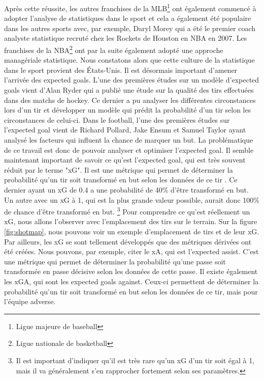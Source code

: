 \documentclass[12pt]{article}
\begin{document}
\newline
Après cette réussite, les autres franchises de la MLB\footnote{Ligue majeure de baseball} ont également commencé à adopter l'analyse de statistiques dans le sport et cela a également été populaire dans les autres sports avec, par exemple, Daryl Morey qui a été le premier coach analyste statistique recruté chez les Rockets de Houston en NBA en 2007. \cite{DarylMorey13year2020}
Les franchises de la NBA\footnote{Ligue nationale de basketball} ont par la suite également adopté une approche managériale statistique.
Nous constatons alors que cette culture de la statistique dans le sport provient des États-Unis.
\newline
Il est désormais important d'amener l'arrivée des expected goals. 
L'une des premières études sur un modèle d'expected goals vient d'Alan Ryder qui a publié une étude sur la qualité des tirs effectuées dans des matchs de hockey. \cite{ryderIsolatingShotQuality2004}
Ce dernier a pu analyser les différentes circonstances lors d'un tir et développer un modèle qui prédit la probabilité d'un tir selon les circonstances de celui-ci.
Dans le football, l'une des premières études sur l'expected goal vient de Richard Pollard, Jake Ensum et Samuel Taylor ayant analysé les facteurs qui influent la chance de marquer un but. \cite{pollardEstimatingProbabilityShot2004} La problématique de ce travail est donc de pouvoir analyser et optimiser l'expected goal.
\newline\newline
Il semble maintenant important de savoir ce qu'est l'expected goal, qui est très souvent réduit par le terme "xG". 
Il est une métrique qui permet de déterminer la probabilité qu'un tir soit transformé en but selon les données de ce tir \cite{XGExplainedFBrefa}.
Ce dernier ayant un xG de 0.4 a une probabilité de 40\% d'être transformé en but. Un autre avec un xG à 1, qui est la plus grande valeur possible, aurait donc 100\% de chance d'être transformé en but.
\footnote{Il est important d'indiquer qu'il est très rare qu'un xG d'un tir soit égal à 1, mais il va généralement s'en rapprocher fortement selon ses paramètres.} \cite{pettyWhatExpectedGoals2018a}
\newline\newline
Pour comprendre ce qu'est réellement un xG, nous allons l'observer avec l'emplacement des tirs sur le terrain.
Sur la figure \ref{fig:shotmap}, nous pouvons voir un exemple d'emplacement de tirs et de leur xG.
\newline \newline
Par ailleurs, les xG se sont tellement développés que des métriques dérivées ont été créées. 
Nous pouvons, par exemple, citer le xA, qui est l'expected assist.
C'est une métrique qui permet de déterminer la probabilité qu'une passe soit transformée en passe décisive selon les données de cette passe. \cite{XGExplainedFBrefa}
Il existe également les xGA, qui sont les expected goals against. 
Ceux-ci permettent de déterminer la probabilité qu'un tir soit transformé en but selon les données de ce tir, mais pour l'équipe adverse. \cite{pettyWhatExpectedGoals2018a}
\end{document}
